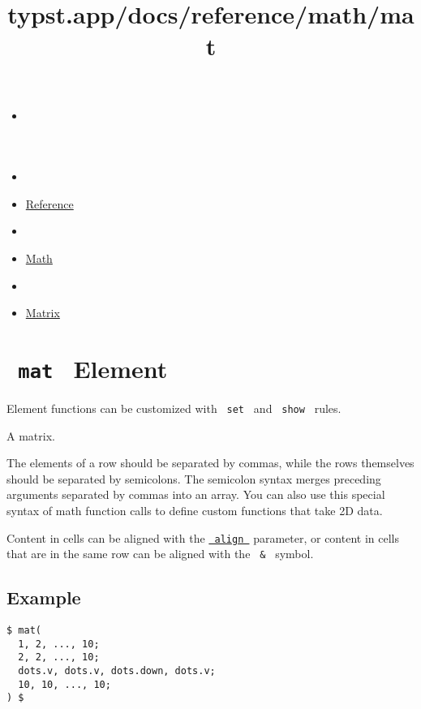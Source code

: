 \title{typst.app/docs/reference/math/mat}

\begin{itemize}
\tightlist
\item
  \href{/docs}{}
\item
  
\item
  \href{/docs/reference/}{Reference}
\item
  
\item
  \href{/docs/reference/math/}{Math}
\item
  
\item
  \href{/docs/reference/math/mat/}{Matrix}
\end{itemize}

\section{\texorpdfstring{\texttt{\ mat\ } {{ Element
}}}{ mat   Element }}\label{summary}

\label{element-tooltip}
Element functions can be customized with \texttt{\ set\ } and
\texttt{\ show\ } rules.

A matrix.

The elements of a row should be separated by commas, while the rows
themselves should be separated by semicolons. The semicolon syntax
merges preceding arguments separated by commas into an array. You can
also use this special syntax of math function calls to define custom
functions that take 2D data.

Content in cells can be aligned with the
\href{/docs/reference/math/mat/\#parameters-align}{\texttt{\ align\ }}
parameter, or content in cells that are in the same row can be aligned
with the \texttt{\ \&\ } symbol.

\subsection{Example}\label{example}

\begin{verbatim}
$ mat(
  1, 2, ..., 10;
  2, 2, ..., 10;
  dots.v, dots.v, dots.down, dots.v;
  10, 10, ..., 10;
) $
\end{verbatim}

